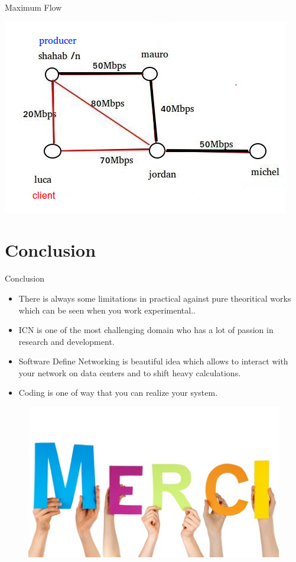 \documentclass[8pt]{beamer}
\newcommand{\1}{\mathbbm 1}
\begin{document}
\begin{frame}{Maximum Flow}
{\includegraphics[scale=0.42]{figures/MaxFlow2.png} 


}




\end{frame}

\section{Conclusion}

\begin{frame}{Conclusion}
\begin{itemize}
 
\item There is always some limitations in practical against pure theoritical works which can be seen when you work experimental..  
\item ICN is one of the most challenging domain who has a lot of passion in research and development.
\item Software Define Networking is beautiful idea which allows to interact with your network on data centers and to shift heavy calculations.

\item Coding is one of way that you can realize your system.
\end{itemize}

\end{frame}


\begin{frame}



\begin{figure}[h!]
  \centering
    \includegraphics[scale=0.5]{figures/merci.jpg}
\end{figure}



\end{frame}
\end{document}

